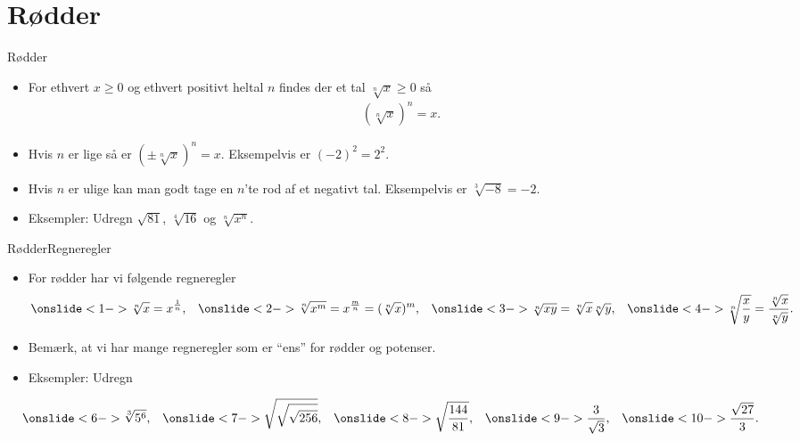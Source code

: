 \section{Rødder}
\begin{frame}{Rødder}
\begin{itemize}
		\setlength\itemsep{1em}
	\item<1-> For ethvert $x\geq 0$ og ethvert positivt heltal $n$ findes der et tal $\sqrt[n]{x}\geq 0$ så
	\begin{align*}
	(\sqrt[n]{x})^n=x.
	\end{align*}
	\item<2-> Hvis $n$ er lige så er $(\pm \sqrt[n]{x})^n=x$. Eksempelvis er $(-2)^2=2^2$.
	\item<3-> Hvis $n$ er ulige kan man godt tage en $n$'te rod af et negativt tal. Eksempelvis er $\sqrt[3]{-8}=-2$.
	\item<4-> Eksempler: Udregn $\sqrt{81}$,  $\sqrt[4]{16}$ og $\sqrt[n]{x^n}$.
\end{itemize}
\end{frame}
\begin{frame}{Rødder}{Regneregler}
\begin{itemize}
		\setlength\itemsep{1em}
	\item<1-> For rødder har vi følgende regneregler
	\begin{align*}
	\onslide<1->{\sqrt[n]{x}=x^{\frac{1}{n}},}&&\onslide<2->{ \sqrt[n]{x^m}=x^{\frac{m}{n}}=(\sqrt[n]{x})^m,}&&\onslide<3->{\sqrt[n]{xy}=\sqrt[n]{x}\sqrt[n]{y},}&& \onslide<4->{\sqrt[n]{\frac{x}{y}}=\frac{\sqrt[n]{x}}{\sqrt[n]{y}}.}
	\end{align*}
	\item<5-> Bemærk, at vi har mange regneregler som er ``ens'' for rødder og potenser.
	\item<6-> Eksempler: Udregn

\end{itemize}
\begin{align*}
\onslide<6->{\sqrt[3]{5^6},}&&\onslide<7->{ \sqrt{\sqrt{\sqrt{256}}},}&&\onslide<8->{\sqrt{\frac{144}{81}},}&&\onslide<9->{ \frac{3}{\sqrt{3}},}&& \onslide<10->{\frac{\sqrt{27}}{3}.}
\end{align*}
\end{frame}

